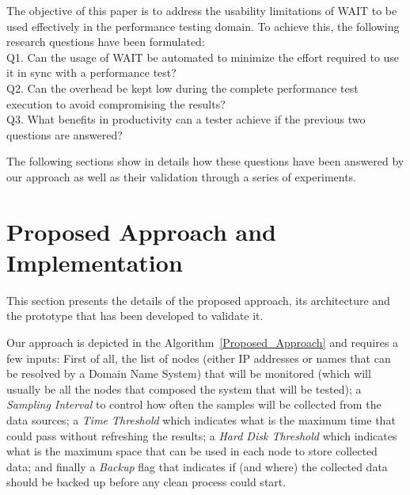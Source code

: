 \documentclass[runningheads,a4paper]{llncs}
\begin{document}
The objective of this paper is to address the usability limitations of WAIT to
be used effectively in the performance testing domain. To achieve this, the
following research questions have been formulated:
\\Q1. Can the usage of WAIT be automated to minimize the effort
required to use it in sync with a performance test?
\\Q2. Can the overhead be kept low during the complete performance test
execution to avoid compromising the results? 
\\Q3. What benefits in productivity can a tester achieve if the previous
two questions are answered?

The following sections show in details how these questions have been answered by
our approach as well as their validation through a series of experiments.


\section{Proposed Approach and Implementation}

This section presents the details of the proposed approach, its architecture
and the prototype that has been developed to validate it.

Our approach is depicted in the Algorithm~\ref{Proposed_Approach} and requires
a few inputs: First of all, the list of nodes (either IP addresses or names that
can be resolved by a Domain Name System) that will be monitored (which
will usually be all the nodes that composed the system that will be tested); a
\emph{Sampling Interval} to control how often the samples will be collected
from the data sources; a \emph{Time Threshold} which indicates what is the
maximum time that could pass without refreshing the results; a \emph{Hard Disk
Threshold} which indicates what is the maximum space that can be used in each
node to store collected data; and finally a \emph{Backup} flag that indicates if
(and where) the collected data should be backed up before any clean process could start.
\end{document}
